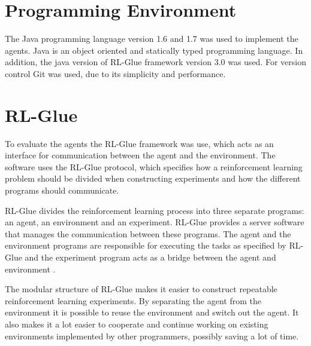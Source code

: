 \section{Programming Environment }
\label{sec:prog_env}
The Java programming language version 1.6 and 1.7 was used to implement the agents. Java is an object oriented and statically typed programming language. In addition, the java version of RL-Glue framework version 3.0 was used. For version control Git was used, due to its simplicity and performance.

\section{RL-Glue }
\label{sec:rl_glue}
To evaluate the agents the RL-Glue framework was use, which acts as an interface for communication between the agent and the environment. The software uses the RL-Glue protocol, which specifies how a reinforcement learning problem should be divided when constructing experiments and how the different programs should communicate.

RL-Glue divides the reinforcement learning process into three separate programs: an agent, an environment and an experiment. RL-Glue provides a server software that manages the communication between these programs. The agent and the environment programs are responsible for executing the tasks as specified by RL-Glue and the experiment program acts as a bridge between the agent and environment \parencite{tanner2009rl}.

The modular structure of RL-Glue makes it easier to construct repeatable reinforcement learning experiments. By separating the agent from the environment it is possible to reuse the environment and switch out the agent. It also makes it a lot easier to cooperate and continue working on existing environments implemented by other programmers, possibly saving a lot of time.